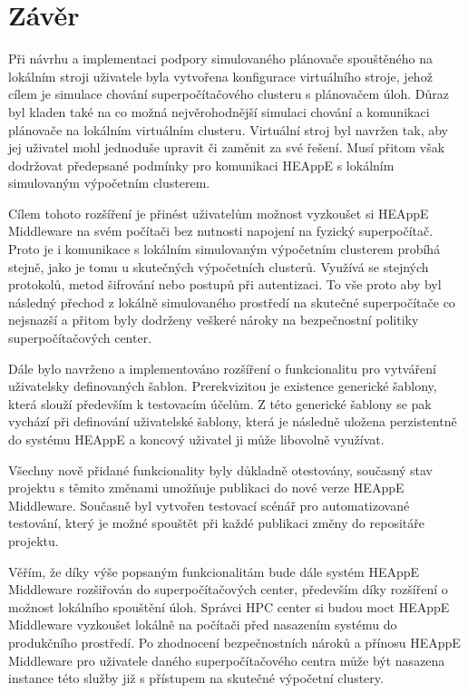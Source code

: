 \chapter{Závěr}
Při návrhu a implementaci podpory simulovaného plánovače spouštěného na lokálním stroji uživatele byla vytvořena konfigurace virtuálního stroje, jehož cílem je simulace chování superpočítačového clusteru s plánovačem úloh. Důraz byl kladen také na co možná nejvěrohodnější simulaci chování a komunikaci plánovače na lokálním virtuálním clusteru. Virtuální stroj byl navržen tak, aby jej uživatel mohl jednoduše upravit či zaměnit za své řešení. Musí přitom však dodržovat předepsané podmínky pro komunikaci HEAppE s lokálním simulovaným výpočetním clusterem.

Cílem tohoto rozšíření je přinést uživatelům možnost vyzkoušet si HEAppE Middleware na svém počítači bez nutnosti napojení na fyzický superpočítač. Proto je i komunikace s lokálním simulovaným výpočetním clusterem probíhá stejně, jako je tomu u skutečných výpočetních clusterů. Využívá se stejných protokolů, metod šifrování nebo postupů při autentizaci. To vše proto aby byl následný přechod z lokálně simulovaného prostředí na skutečné superpočítače co nejsnazší a přitom byly dodrženy veškeré nároky na bezpečnostní politiky superpočítačových center.

Dále bylo navrženo a implementováno rozšíření o funkcionalitu pro vytváření uživatelsky definovaných šablon. Prerekvizitou je existence generické šablony, která slouží především k testovacím účelům. Z této generické šablony se pak vychází při definování uživatelské šablony, která je následně uložena perzistentně do systému HEAppE a koncový uživatel ji může libovolně využívat.

Všechny nově přidané funkcionality byly důkladně otestovány, současný stav projektu s těmito změnami umožňuje publikaci do nové verze HEAppE Middleware. Současně byl vytvořen testovací scénář pro automatizované testování, který je možné spouštět při každé publikaci změny do repositáře projektu.

Věřím, že díky výše popsaným funkcionalitám bude dále systém HEAppE Middleware rozšiřován do superpočítačových center, především díky rozšíření o možnost lokálního spouštění úloh. Správci HPC center si budou moct HEAppE Middleware vyzkoušet lokálně na počítači před nasazením systému do produkčního prostředí. Po zhodnocení bezpečnostních nároků a přínosu HEAppE Middleware pro uživatele daného superpočítačového centra může být nasazena instance této služby již s přístupem na skutečné výpočetní clustery.
\endinput